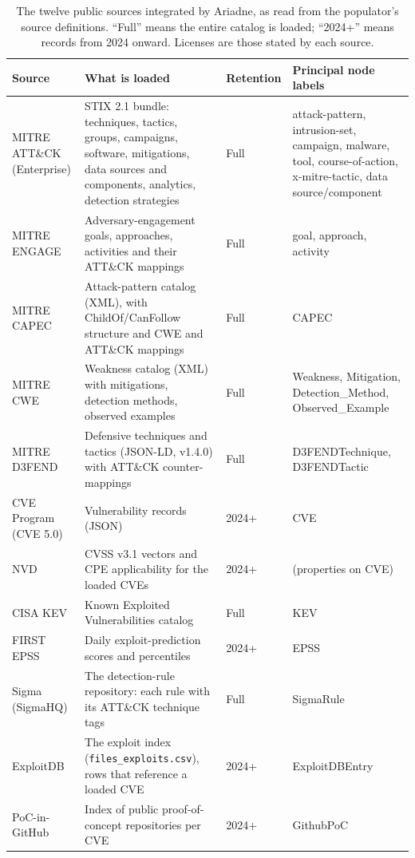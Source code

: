 \documentclass[twocolumn]{svjour3}
\begin{document}
\begin{table}
\centering\footnotesize
\caption{The twelve public sources integrated by Ariadne, as read from the populator's source definitions. ``Full'' means the entire catalog is loaded; ``2024+'' means records from 2024 onward. Licenses are those stated by each source.}\label{tab:sources}
\begin{tabularx}{\textwidth}{@{}P{2.9cm}XP{1.45cm}P{3.6cm}@{}}
\toprule Source & What is loaded & Retention & Principal node labels \\\midrule
MITRE ATT\&CK (Enterprise) & STIX 2.1 bundle: techniques, tactics, groups, campaigns, software, mitigations, data sources and components, analytics, detection strategies & Full & attack-pattern, intrusion-set, campaign, malware, tool, course-of-action, x-mitre-tactic, data source/component \\
MITRE ENGAGE & Adversary-engagement goals, approaches, activities and their ATT\&CK mappings & Full & goal, approach, activity \\
MITRE CAPEC & Attack-pattern catalog (XML), with ChildOf/CanFollow structure and CWE and ATT\&CK mappings & Full & CAPEC \\
MITRE CWE & Weakness catalog (XML) with mitigations, detection methods, observed examples & Full & Weakness, Mitigation, Detection\_Method, Observed\_Example \\
MITRE D3FEND & Defensive techniques and tactics (JSON-LD, v1.4.0) with ATT\&CK counter-mappings & Full & D3FENDTechnique, D3FENDTactic \\
CVE Program (CVE 5.0) & Vulnerability records (JSON) & 2024+ & CVE \\
NVD & CVSS v3.1 vectors and CPE applicability for the loaded CVEs & 2024+ & (properties on CVE) \\
CISA KEV & Known Exploited Vulnerabilities catalog & Full & KEV \\
FIRST EPSS & Daily exploit-prediction scores and percentiles & 2024+ & EPSS \\
Sigma (SigmaHQ) & The detection-rule repository: each rule with its ATT\&CK technique tags & Full & SigmaRule \\
ExploitDB & The exploit index (\texttt{files\_exploits.csv}), rows that reference a loaded CVE & 2024+ & ExploitDBEntry \\
PoC-in-GitHub & Index of public proof-of-concept repositories per CVE & 2024+ & GithubPoC \\
\bottomrule
\end{tabularx}
\end{table}
\end{document}
